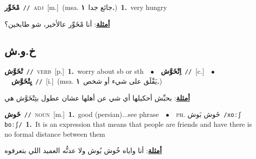 \documentclass[10pt,a4paper,twoside]{article} %
\begin{document}
\begin{multicols}{2}
{\setlength\topsep{0pt}\textbf{\foreignlanguage{arabic}{مْخَوِّر}}\ {\color{gray}\texttt{//}\color{black}}\ \textsc{adj}\ [m.]\ \color{gray}(msa. \foreignlanguage{arabic}{جائع جدا}~\foreignlanguage{arabic}{\textbf{١.}})\color{black}\ \textbf{1.}~very hungry\  \begin{flushright}\color{gray}\foreignlanguage{arabic}{\textbf{\underline{\foreignlanguage{arabic}{أمثلة}}}: أنا مْخَوِّر عالأخير، شو طابخين؟}\end{flushright}\color{black}} \vspace{2mm}

\vspace{-3mm}
\subsection*{\color{blue}\foreignlanguage{arabic}{خ.و.ش}\color{blue}{}} 

{\setlength\topsep{0pt}\textbf{\foreignlanguage{arabic}{تْخَوَّش}}\ {\color{gray}\texttt{//}\color{black}}\ \textsc{verb}\ [p.]\ \textbf{1.}~worry about sb or sth\ \ $\bullet$\ \ \setlength\topsep{0pt}\textbf{\foreignlanguage{arabic}{اِتْخَوَّش}}\ {\color{gray}\texttt{//}\color{black}}\ [c.]\ \ $\bullet$\ \ \setlength\topsep{0pt}\textbf{\foreignlanguage{arabic}{يِتْخَوَّش}}\ {\color{gray}\texttt{//}\color{black}}\ [i.]\ \color{gray}(msa. \foreignlanguage{arabic}{يَقْلَق على شيء أو شخص}~\foreignlanguage{arabic}{\textbf{١.}})\color{black}\  \begin{flushright}\color{gray}\foreignlanguage{arabic}{\textbf{\underline{\foreignlanguage{arabic}{أمثلة}}}: بحبِّش أحكيلها أي شي عن أهلها عشان عطول بتِتْخَوَّش هي}\end{flushright}\color{black}} \vspace{2mm}

{\setlength\topsep{0pt}\textbf{\foreignlanguage{arabic}{خَوش}}\ {\color{gray}\texttt{//}\color{black}}\ \textsc{noun}\ [m.]\ \textbf{1.}~good (persian)...see phrase\ \ $\bullet$\ \ \textsc{ph.} \color{gray} \foreignlanguage{arabic}{خَوش بَوش}\color{black}\ {\color{gray}\texttt{/{\sffamily xoːʃ boːʃ}/}\color{black}}\ \textbf{1.}~It is an expression that means that people are friends and have there is no formal distance between them\  \begin{flushright}\color{gray}\foreignlanguage{arabic}{\textbf{\underline{\foreignlanguage{arabic}{أمثلة}}}: أنا واياه خُوش بُوش ولا عدنُّه العميد اللي بتعرفوه}\end{flushright}\color{black}} \vspace{2mm}


\end{multicols}
\end{document}
